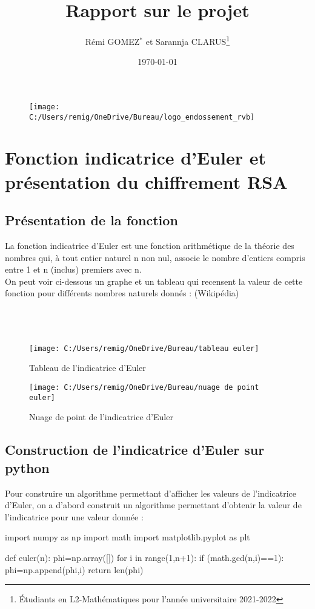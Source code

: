 \documentclass[12pt]{article}
\begin{document}
\title{\bf Rapport sur le projet}
\author{Rémi GOMEZ${}^\ast$ et Sarannja CLARUS\footnote{\'Etudiants en L2-Mathématiques pour l'année universitaire 2021-2022}}
\date{\today}
\maketitle


\begin{figure}[h]
	\texttt{[image: C:/Users/remig/OneDrive/Bureau/logo\_endossement\_rvb]}
	\centering
\end{figure}
\tableofcontents



\newpage


\section{Fonction indicatrice d'Euler et présentation du chiffrement RSA}
\subsection{Présentation de la fonction}
La fonction indicatrice d'Euler est une fonction arithmétique de la théorie des nombres qui, à tout entier naturel n non nul, associe le nombre d'entiers compris entre 1 et n (inclus) premiers avec n.
\\
On peut voir ci-dessous un graphe et un tableau qui recensent la valeur de cette fonction pour différents nombres naturels donnés : (Wikipédia)
\\
\\
\\
\\
\begin{figure}[h]
    \begin{minipage}[c]{.46\linewidth}
        \centering
        \texttt{[image: C:/Users/remig/OneDrive/Bureau/tableau euler]}
        \caption{Tableau de l'indicatrice d'Euler}
    \end{minipage}
    \hfill%
    \begin{minipage}[c]{.46\linewidth}
        \centering
        \texttt{[image: C:/Users/remig/OneDrive/Bureau/nuage de point euler]}
        \caption{Nuage de point de l'indicatrice d'Euler}
    \end{minipage}
\end{figure}
\newpage
\subsection{Construction de l'indicatrice d'Euler sur python}
Pour construire un algorithme permettant d'afficher les valeurs de l'indicatrice d'Euler, on a d'abord construit un algorithme permettant d'obtenir la valeur de l'indicatrice pour une valeur donnée :
\begin{python}
import numpy as np
import math
import matplotlib.pyplot as plt

def euler(n):
    phi=np.array([])
    for i in range(1,n+1):
        if (math.gcd(n,i)==1):
            phi=np.append(phi,i)
    return len(phi)
\end{python}
\end{document}
